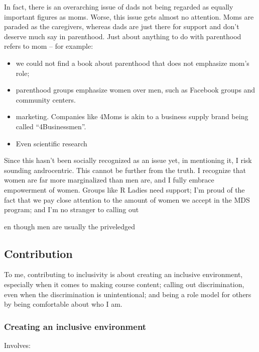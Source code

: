 \documentclass[]{article}
\providecommand{\tightlist}{%
  \setlength{\itemsep}{0pt}\setlength{\parskip}{0pt}}
\begin{document}
In fact, there is an overarching issue of dads not being regarded as equally important figures as moms. Worse, this issue gets almost no attention. Moms are paraded as the caregivers, whereas dads are just there for support and don't deserve much say in parenthood. Just about anything to do with parenthood refers to mom -- for example:

\begin{itemize}
\tightlist
\item
  we could not find a book about parenthood that does not emphasize mom's role;
\item
  parenthood groups emphasize women over men, such as Facebook groups and community centers.
\item
  marketing. Companies like 4Moms is akin to a business supply brand being called ``4Businessmen''.
\item
  Even scientific research
\end{itemize}

Since this hasn't been socially recognized as an issue yet, in mentioning it, I risk sounding androcentric. This cannot be further from the truth. I recognize that women are far more marginalized than men are, and I fully embrace empowerment of women. Groups like R Ladies need support; I'm proud of the fact that we pay close attention to the amount of women we accept in the MDS program; and I'm no stranger to calling out

en though men are usually the priveledged

\hypertarget{contribution}{%
\subsection{Contribution}\label{contribution}}

To me, contributing to inclusivity is about creating an inclusive environment, especially when it comes to making course content; calling out discrimination, even when the discrimination is unintentional; and being a role model for others by being comfortable about who I am.

\hypertarget{creating-an-inclusive-environment}{%
\subsubsection{Creating an inclusive environment}\label{creating-an-inclusive-environment}}

Involves:
\end{document}
